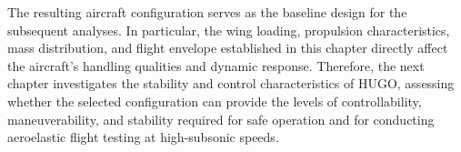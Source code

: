 The resulting aircraft configuration serves as the baseline design for the subsequent analyses. In particular, the wing loading, propulsion characteristics, mass distribution, and flight envelope established in this chapter directly affect the aircraft's handling qualities and dynamic response. Therefore, the next chapter investigates the stability and control characteristics of HUGO, assessing whether the selected configuration can provide the levels of controllability, maneuverability, and stability required for safe operation and for conducting aeroelastic flight testing at high-subsonic speeds.





